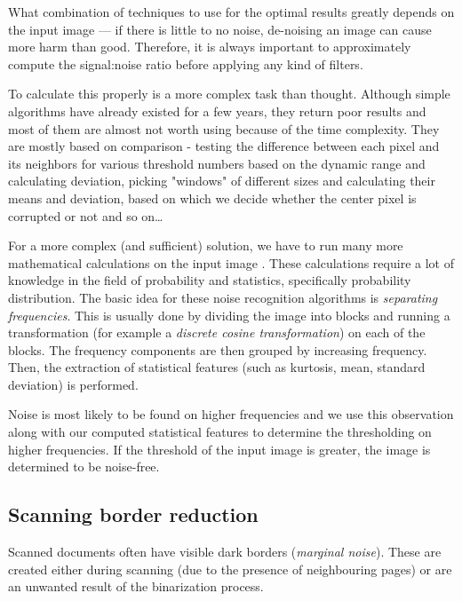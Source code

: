 What combination of techniques to use for the optimal results greatly depends on the input image --- if there is little to no noise, de-noising an image can cause more harm than good. Therefore, it is always important to approximately compute the signal:noise ratio before applying any kind of filters.


To calculate this properly is a more complex task than thought. Although simple algorithms have already existed for a few years, they return poor results and most of them are almost not worth using because of the time complexity. They are mostly based on comparison - testing the difference between each pixel and its neighbors for various threshold numbers based on the dynamic range and calculating deviation, picking "windows" of different sizes and calculating their means and deviation, based on which we decide whether the center pixel is corrupted or not and so on\ldots

For a more complex (and sufficient) solution, we have to run many more mathematical calculations on the input image \citep{noiseDetection}. These calculations require a lot of knowledge in the field of probability and statistics, specifically probability distribution. The basic idea for these noise recognition algorithms is \emph{separating frequencies}. This is usually done by dividing the image into blocks and running a transformation (for example a \emph{discrete cosine transformation}) on each of the blocks. The frequency components are then grouped by increasing frequency. Then, the extraction of statistical features (such as kurtosis, mean, standard deviation) is performed.

Noise is most likely to be found on higher frequencies and we use this observation along with our computed statistical features to determine the thresholding on higher frequencies. If the threshold of the input image is greater, the image is determined to be noise-free. 

\subsection{Scanning border reduction}

Scanned documents often have visible dark borders (\emph{marginal noise}). These are created either during scanning (due to the presence of neighbouring pages) or are an unwanted result of the binarization process.

